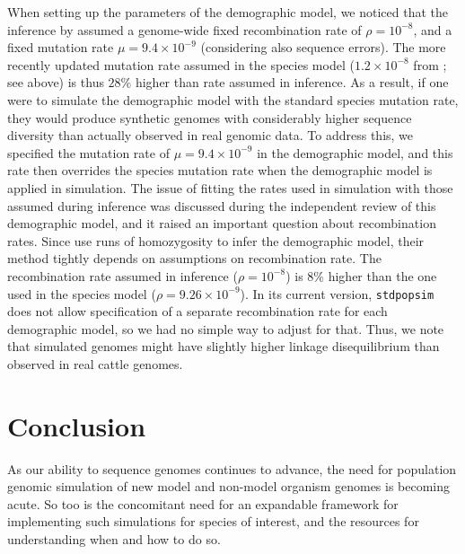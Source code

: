 \documentclass[hidelinks]{article}
\newcommand{\stdpopsim}{\texttt{stdpopsim}\xspace}
\begin{document}
When setting up the parameters of the demographic model, we noticed that the inference by \cite{MacLeod2013} assumed a genome-wide fixed recombination rate of \(\rho=10^{-8}\), and a fixed mutation rate \(\mu=9.4 \times 10^{-9}\) (considering also sequence errors).
%
The more recently updated mutation rate assumed in the species model (\(1.2\times 10^{-8}\) from  \citep{Harland2017}; see above) is thus \(28\%\) higher than rate assumed in inference.
%
As a result, if one were to simulate the demographic model with the standard species mutation rate, they would produce synthetic genomes with considerably higher sequence diversity than actually observed in real genomic data.
%
To address this, we specified the mutation rate of \(\mu=9.4 \times 10^{-9}\) in the demographic model, and this rate then overrides the species mutation rate when the demographic model is applied in simulation.
%
%
The issue of fitting the rates used in simulation with those assumed during inference was discussed during the independent review of this demographic model, and it raised an important question about recombination rates. Since \cite{MacLeod2013} use runs of homozygosity to infer the demographic model, their method tightly depends on assumptions on recombination rate. The recombination rate assumed in inference (\(\rho=10^{-8}\)) is \(8\%\) higher than the one used in the species model (\(\rho=9.26\times 10^{-9}\)). In its current version, \texttt{\stdpopsim} does not allow specification of a separate recombination rate for each demographic model, so we had no simple way to adjust for that. Thus, we note that simulated genomes might have slightly higher linkage disequilibrium than observed in real cattle genomes.

\hypertarget{conclusion}{%
\section*{Conclusion}\label{conclusion}}

As our ability to sequence genomes continues to advance, the need for
population genomic simulation of new model and non-model organism genomes is
becoming acute. So too is the concomitant need for an expandable framework
for implementing such simulations for species of interest, and
the resources for understanding when and how to do so.
\end{document}
